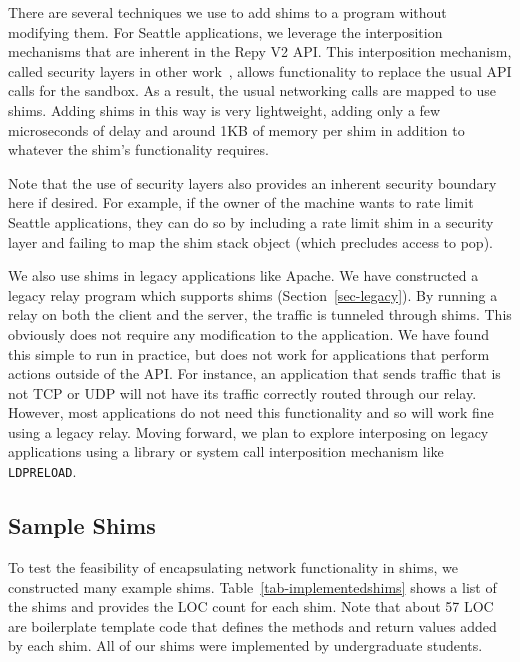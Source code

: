 
There are several techniques we use to add shims to a program without
modifying them.  For Seattle applications, we leverage the interposition
mechanisms that are inherent in the Repy V2 API.   This interposition 
mechanism, called security layers in other work~\cite{Cappos_CCS_10}, allows
functionality to replace the usual API calls for the sandbox.   As a result,
the usual networking calls are mapped to use shims.   Adding shims in this way
is very lightweight, adding only a few microseconds of delay and around 1KB of 
memory per shim in addition to whatever the shim's functionality requires.

Note that the use of security layers also provides
an inherent security boundary here if desired.   For example, if the owner
of the machine wants to rate limit Seattle applications, they can do so
by including a rate limit shim in a security layer and failing to
map the shim stack object (which precludes access to pop).   

We also use shims in legacy applications like Apache.   
We have constructed a legacy relay
program which supports shims (Section~\ref{sec-legacy}).   By running 
a relay on both the client and the server, the traffic is tunneled through
shims.   This obviously does not require any modification to the application.
We have found this simple to run in practice, but does not work for 
applications that perform actions outside of the API.   For instance, an 
application that sends traffic that is not TCP or UDP will not have its 
traffic correctly routed through our relay.   However, most applications do 
not need this functionality and so will work fine using a legacy relay.  Moving forward,
we plan to explore interposing on legacy applications using a 
library or system call interposition mechanism like {\tt LDPRELOAD}.



\subsection{Sample Shims}
\label{sec-examplelayers}

To test the feasibility of encapsulating network functionality in shims, 
we constructed many example shims.   Table~\ref{tab-implementedshims} 
shows a list of the shims and provides the LOC count for each shim.   
Note that about 57 LOC are boilerplate template code that defines the
methods and return values added by each shim.   All of our shims were
implemented by undergraduate students.   

